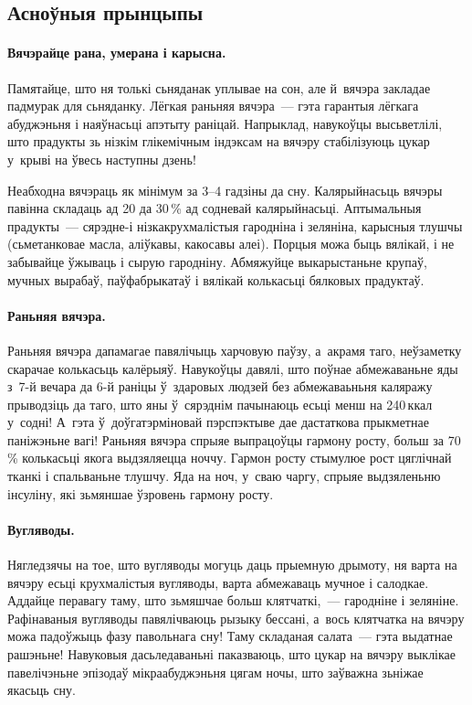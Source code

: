 \subsection{Асноўныя прынцыпы}

\paragraph{Вячэрайце рана, умерана і карысна.}
Памятайце, што ня толькі сьняданак уплывае на сон, але й~вячэра закладае падмурак для сьняданку. Лёгкая раньняя вячэра~--- гэта гарантыя лёгкага абуджэньня і наяўнасьці апэтыту раніцай. Напрыклад, навукоўцы высьветлілі, што прадукты зь нізкім глікемічным індэксам на вячэру стабілізуюць цукар у~крыві на ўвесь наступны дзень!

Неабходна вячэраць як мінімум за 3--4 гадзіны да сну. Калярыйнасьць вячэры павінна складаць ад 20 да 30\,\% ад содневай калярыйнасьці. Аптымальныя прадукты~--- сярэдне-і нізкакрухмалістыя гародніна і зеляніна, карысныя тлушчы (сьметанковае масла, аліўкавы, какосавы алеі). Порцыя можа быць вялікай, і не забывайце ўжываць і сырую гародніну. Абмяжуйце выкарыстаньне крупаў, мучных вырабаў, паўфабрыкатаў і вялікай колькасьці бялковых прадуктаў.


\paragraph{Раньняя вячэра.}
Раньняя вячэра дапамагае павялічыць харчовую паўзу, а~акрамя таго, неўзаметку скарачае колькасьць калёрыяў. Навукоўцы давялі, што поўнае абмежаваньне яды з~7-й вечара да 6-й раніцы ў~здаровых людзей без абмежаваьньня каляражу прыводзіць да таго, што яны ў~сярэднім пачынаюць есьці менш на 240\,ккал у~содні! А~гэта ў~доўгатэрміновай пэрспэктыве дае дастаткова прыкметнае паніжэньне вагі! Раньняя вячэра спрыяе выпрацоўцы гармону росту, больш за 70\,\% колькасьці якога выдзяляецца ноччу. Гармон росту стымулюе рост цяглічнай тканкі і спальваньне тлушчу. Яда на ноч, у~сваю чаргу, спрыяе выдзяленьню інсуліну, які зьмяншае ўзровень гармону росту.

\paragraph{Вугляводы.}
Нягледзячы на тое, што вугляводы могуць даць прыемную дрымоту, ня варта на вячэру есьці крухмалістыя вугляводы, варта абмежаваць мучное і салодкае. Аддайце перавагу таму, што зьмяшчае больш клятчаткі,~--- гародніне і зеляніне. Рафінаваныя вугляводы павялічваюць рызыку бессані, а~вось клятчатка на вячэру можа падоўжыць фазу павольнага сну! Таму складаная салата~--- гэта выдатнае рашэньне! Навуковыя дасьледаваньні паказваюць, што цукар на вячэру выклікае павелічэньне эпізодаў мікраабуджэньня цягам ночы, што заўважна зьніжае якасьць сну.

